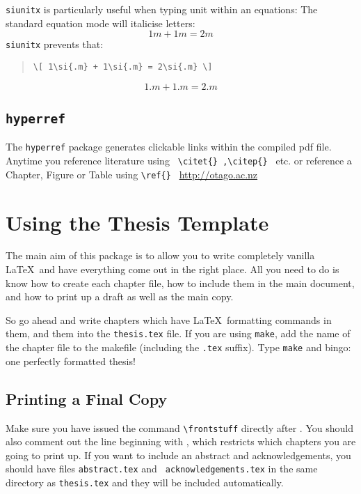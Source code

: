 \verb|siunitx| is particularly useful when typing unit within an equations:
The standard equation mode will italicise letters:
\[ 1m + 1m = 2m\]
\verb|siunitx| prevents that:
\begin{quote}
\begin{verbatim}
\[ 1\si{.m} + 1\si{.m} = 2\si{.m} \]
\end{verbatim}
\end{quote}

\[ 1\si{.m} + 1\si{.m} = 2\si{.m}\]




\subsection{{\tt hyperref}}
The {\tt hyperref} package generates clickable links within the compiled pdf file.
Anytime you reference literature using \verb| \citet{} ,\citep{} | etc. 
or reference a Chapter, Figure or Table using \verb|\ref{} | 
\url{http://otago.ac.nz}




\section{Using the Thesis Template}
The main aim of this package is to allow you to write completely
vanilla \LaTeX\ and have everything come out in the right place.  All
you need to do is know how to create each chapter file, how to include
them in the main document, and how to print up a draft as well as the
main copy.

So go ahead and write chapters which have \LaTeX\ formatting commands
in them, and \verb|| them into the {\tt thesis.tex} file.
If you are using \verb|make|, add the name of the chapter file to the
makefile (including the \verb|.tex| suffix). Type {\tt make} and
bingo: one perfectly formatted thesis!

\subsection{Printing a Final Copy}
Make sure you have issued the command \verb|\frontstuff| directly
after \verb||.  You should also comment out the line
beginning with \verb||, which restricts which chapters
you are going to print up.  If you want to include an abstract and
acknowledgements, you should have files {\tt abstract.tex} and {\tt
acknowledgements.tex} in the same directory as {\tt thesis.tex} and
they will be included automatically.


